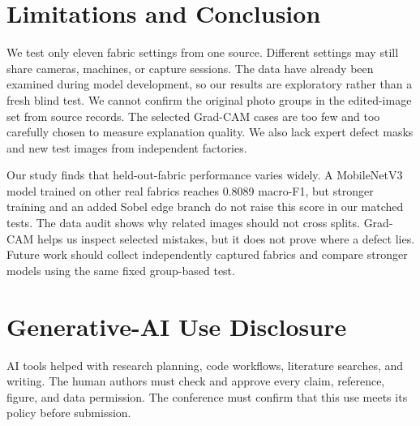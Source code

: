 \documentclass[conference,a4paper]{IEEEtran}
\begin{document}
\section{Limitations and Conclusion}
We test only eleven fabric settings from one source. Different settings may still share cameras, machines, or capture sessions. The data have already been examined during model development, so our results are exploratory rather than a fresh blind test. We cannot confirm the original photo groups in the edited-image set from source records. The selected Grad-CAM cases are too few and too carefully chosen to measure explanation quality. We also lack expert defect masks and new test images from independent factories.

Our study finds that held-out-fabric performance varies widely. A MobileNetV3 model trained on other real fabrics reaches 0.8089 macro-F1, but stronger training and an added Sobel edge branch do not raise this score in our matched tests. The data audit shows why related images should not cross splits. Grad-CAM helps us inspect selected mistakes, but it does not prove where a defect lies. Future work should collect independently captured fabrics and compare stronger models using the same fixed group-based test.

\section*{Generative-AI Use Disclosure}
AI tools helped with research planning, code workflows, literature searches, and writing. The human authors must check and approve every claim, reference, figure, and data permission. The conference must confirm that this use meets its policy before submission.
\end{document}

